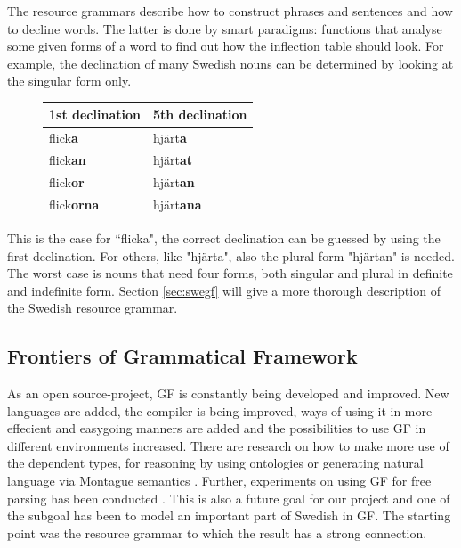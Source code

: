 \documentclass{report}
\begin{document}
The resource grammars describe how to construct phrases and sentences and how to
decline words. The latter is done by smart paradigms: functions that analyse
some given forms of a word to find out how the inflection table should look.
For example, the declination of many Swedish nouns can be determined by looking
at the singular form only. 
\begin{figure}
\begin{tabular}{| l | l |}
\hline
1st declination & 5th declination \\
\hline
flick\textbf{a}    &     hjärt\textbf{a}   \\
flick\textbf{an}    &    hjärt\textbf{at}  \\
flick\textbf{or}    &    hjärt\textbf{an}  \\
flick\textbf{orna}  &    hjärt\textbf{ana} \\
\hline
\end{tabular}
\end{figure}
This is the case for ``flicka", the correct declination
can be guessed by using the first declination. %
For others, like "hjärta", also the plural form "hjärtan" is needed.
The worst case is nouns that need four forms, both singular and
plural in definite and indefinite form.
Section \ref{sec:swegf} will give a more thorough description of the Swedish resource grammar.

\subsection{Frontiers of Grammatical Framework}
As an open source-project, GF is constantly being developed and improved. New
languages are added, the compiler is being improved, ways of using it in more 
effecient and easygoing manners are added
and the possibilities to use GF in different environments
increased. There are research on how to make more use of the dependent
types, for reasoning by using ontologies \cite{ramona} or generating natural
language via Montague semantics \cite{montague}.
Further, experiments on using GF for free parsing has been conducted
\cite[]{gfMech}.
This is also a future goal for our project and one of the subgoal has been to
model an important part of Swedish in GF. The starting point was the resource
grammar to which the result has a strong connection.
\end{document}
